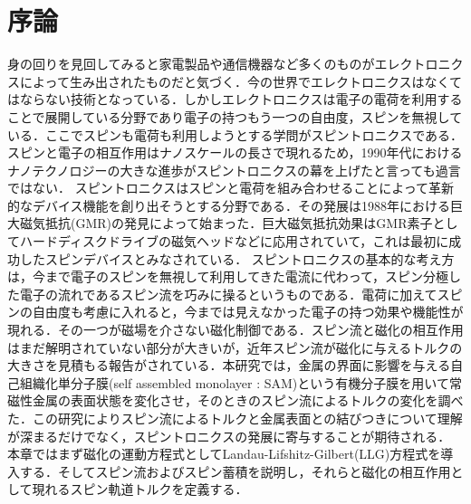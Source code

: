 
\chapter{序論}\label{chap:intro}





身の回りを見回してみると家電製品や通信機器など多くのものがエレクトロニクスによって生み出されたものだと気づく．今の世界でエレクトロニクスはなくてはならない技術となっている．しかしエレクトロニクスは電子の電荷を利用することで展開している分野であり電子の持つもう一つの自由度，スピンを無視している．ここでスピンも電荷も利用しようとする学問がスピントロニクスである．スピンと電子の相互作用はナノスケールの長さで現れるため\cite{maekawa2002spin}，1990年代におけるナノテクノロジーの大きな進歩がスピントロニクスの幕を上げたと言っても過言ではない．
スピントロニクスはスピンと電荷を組み合わせることによって革新的なデバイス機能を創り出そうとする分野である\cite{prinz1998magnetoelectronics,vzutic2004spintronics,wolf2001spintronics}．その発展は1988年における巨大磁気抵抗(GMR)の発見\cite{baibich1988giant,binasch1989enhanced}によって始まった．巨大磁気抵抗効果はGMR素子としてハードディスクドライブの磁気ヘッドなどに応用されていて，これは最初に成功したスピンデバイスとみなされている．
スピントロニクスの基本的な考え方は，今まで電子のスピンを無視して利用してきた電流に代わって，スピン分極した電子の流れであるスピン流を巧みに操るというものである．電荷に加えてスピンの自由度も考慮に入れると，今までは見えなかった電子の持つ効果や機能性が現れる．その一つが磁場を介さない磁化制御である．スピン流と磁化の相互作用はまだ解明されていない部分が大きいが，近年スピン流が磁化に与えるトルクの大きさを見積もる報告がされている\cite{hayashi2014quantitative,yang2014platinum}．本研究では，金属の界面に影響を与える自己組織化単分子膜(self assembled monolayer : SAM)という有機分子膜\cite{de2005tuning,love2005self,xu2014regulating}を用いて常磁性金属の表面状態を変化させ，そのときのスピン流によるトルクの変化を調べた．この研究によりスピン流によるトルクと金属表面との結びつきについて理解が深まるだけでなく，スピントロニクスの発展に寄与することが期待される．
本章ではまず磁化の運動方程式としてLandau-Lifshitz-Gilbert(LLG)方程式を導入する．そしてスピン流およびスピン蓄積を説明し，それらと磁化の相互作用として現れるスピン軌道トルクを定義する．

